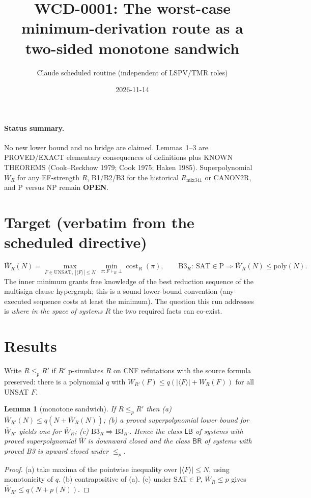 \documentclass[11pt]{article}
\title{WCD-0001: The worst-case minimum-derivation route as a two-sided monotone sandwich}
\author{Claude scheduled routine (independent of LSPV/TMR roles)}
\date{2026-11-14}
\newtheorem{lemma}{Lemma}
\begin{document}
\maketitle

\paragraph{Status summary.} No new lower bound and no bridge are claimed.
Lemmas~1--3 are PROVED/EXACT elementary consequences of definitions plus KNOWN THEOREMS
(Cook--Reckhow 1979; Cook 1975; Haken 1985). Superpolynomial $\overline W_R$ for any
EF-strength $R$, B1/B2/B3 for the historical $R_{\mathrm{mix341}}$ or CANON2R, and
P versus NP remain \textbf{OPEN}.

\section{Target (verbatim from the scheduled directive)}
\[
\overline W_R(N)=\max_{F\in\mathrm{UNSAT},\ |\langle F\rangle|\le N}\ \min_{\pi:F\vdash_R\bot}\operatorname{cost}_R(\pi),
\qquad
\text{B3}_R:\ \mathrm{SAT}\in\mathrm P\Rightarrow \overline W_R(N)\le \mathrm{poly}(N).
\]
The inner minimum grants free knowledge of the best reduction sequence of the
multisign clause hypergraph; this is a sound lower-bound convention (any executed
sequence costs at least the minimum). The question this run addresses is
\emph{where in the space of systems $R$} the two required facts can co-exist.

\section{Results}
Write $R\le_p R'$ if $R'$ p-simulates $R$ on CNF refutations with the source
formula preserved: there is a polynomial $q$ with
$W_{R'}(F)\le q(|\langle F\rangle|+W_R(F))$ for all UNSAT $F$.

\begin{lemma}[monotone sandwich]\label{l:mono}
If $R\le_p R'$ then (a) $\overline W_{R'}(N)\le q(N+\overline W_R(N))$;
(b) a proved superpolynomial lower bound for $\overline W_{R'}$ yields one for
$\overline W_R$; (c) $\mathrm{B3}_R\Rightarrow\mathrm{B3}_{R'}$.
Hence the class $\mathsf{LB}$ of systems with proved superpolynomial
$\overline W$ is downward closed and the class $\mathsf{BR}$ of systems with
proved B3 is upward closed under $\le_p$.
\end{lemma}
\begin{proof}
(a) take maxima of the pointwise inequality over $|\langle F\rangle|\le N$, using
monotonicity of $q$. (b) contrapositive of (a). (c) under SAT$\in$P,
$\overline W_R\le p$ gives $\overline W_{R'}\le q(N+p(N))$.
\end{proof}
\end{document}
